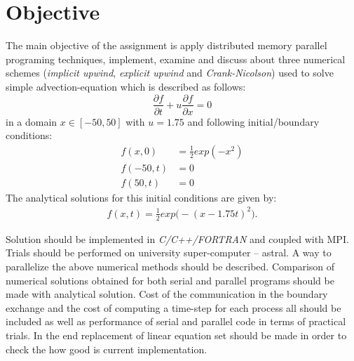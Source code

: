 \section{Objective} \label{s:introduction:objective}
	The main objective of the assignment is apply distributed memory parallel programing techniques, implement, examine and discuss about three numerical schemes (\emph{implicit upwind}, \emph{explicit upwind} and \emph{Crank-Nicolson}) used to solve simple \gls{advection-equation} which is described as follows:	
	\begin{equation} \label{eq:advection-equation}
	\frac{\partial f}{\partial t} +  u\frac{\partial f}{\partial x} = 0
	\end{equation}
	in a domain $x \in [-50,50]$ with $u = 1.75$ and following initial/boundary conditions:	
	\begin{equation} \label{eq:boundary-conditions}
		\begin{split}
			f(x, 0) &= \frac{1}{2} exp(-x^2) \\
			f(-50, t) &= 0 \\
			f(50, t) &= 0
		\end{split}
	\end{equation}
	The analytical solutions for this initial conditions are given by:
	\begin{equation} \label{eq:analytical-solution}
			\begin{split}
				f(x, t) = \frac{1}{2} exp \bigg( -(x - 1.75t)^2 \bigg).
			\end{split}
	\end{equation}
	
	Solution should be implemented in \emph{C/C++/FORTRAN} and coupled with \gls{MPI}. Trials should be performed on university \gls{super-computer} -- \gls{astral}. A way to parallelize the above numerical methods should be described. Comparison of numerical solutions obtained for both serial and parallel programs should be made with analytical solution. Cost of the communication in the boundary exchange and the cost of computing a time-step for each process all should be included as well as performance of serial and parallel code in terms of practical trials. In the end replacement of linear equation set should be made in order to check the how good is current implementation.
	